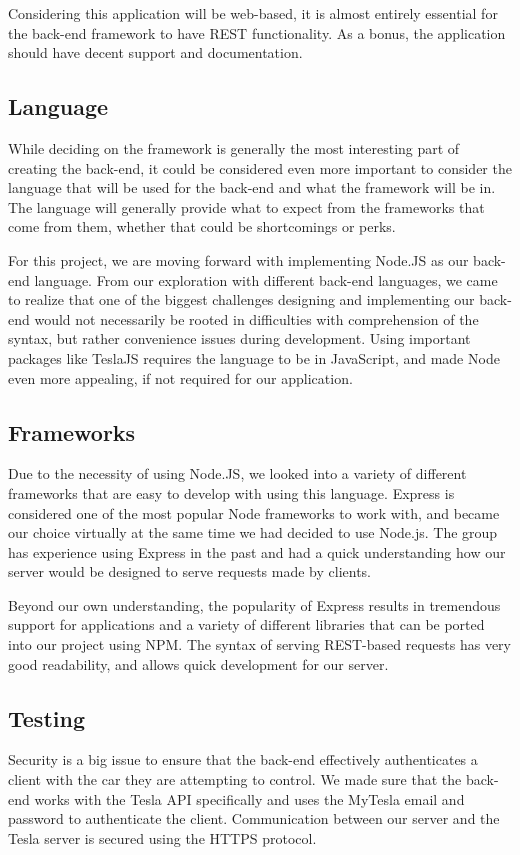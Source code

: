 \documentclass[onecolumn, draftclsnofoot,10pt, compsoc]{IEEEtran}
\begin{document}
        Considering this application will be web-based, it is almost entirely essential for the back-end framework to have REST functionality. As a bonus, the application should have decent support and documentation. 
    \subsection{Language}
        While deciding on the framework is generally the most interesting part of creating the back-end, it could be considered even more important to consider the language that will be used for the back-end and what the framework will be in. The language will generally provide what to expect from the frameworks that come from them, whether that could be shortcomings or perks.
        
        For this project, we are moving forward with implementing Node.JS as our back-end language. From our exploration with different back-end languages, we came to realize that one of the biggest challenges designing and implementing our back-end would not necessarily be rooted in difficulties with comprehension of the syntax, but rather convenience issues during development. Using important packages like TeslaJS requires the language to be in JavaScript, and made Node even more appealing, if not required for our application.\cite{intersog_2017}
    \subsection{Frameworks}
        Due to the necessity of using Node.JS, we looked into a variety of different frameworks that are easy to develop with using this language. Express is considered one of the most popular Node frameworks to work with, and became our choice virtually at the same time we had decided to use Node.js. The group has experience using Express in the past and had a quick understanding how our server would be designed to serve requests made by clients.
        
        Beyond our own understanding, the popularity of Express results in tremendous support for applications and a variety of different libraries that can be ported into our project using NPM. The syntax of serving REST-based requests has very good readability, and allows quick development for our server. \cite{tripathi_2018} 
    \subsection{Testing}
        Security is a big issue to ensure that the back-end effectively authenticates a client with the car they are attempting to control. We made sure that the back-end works with the Tesla API specifically and uses the MyTesla email and password to authenticate the client. Communication between our server and the Tesla server is secured using the HTTPS protocol.  
\end{document}
